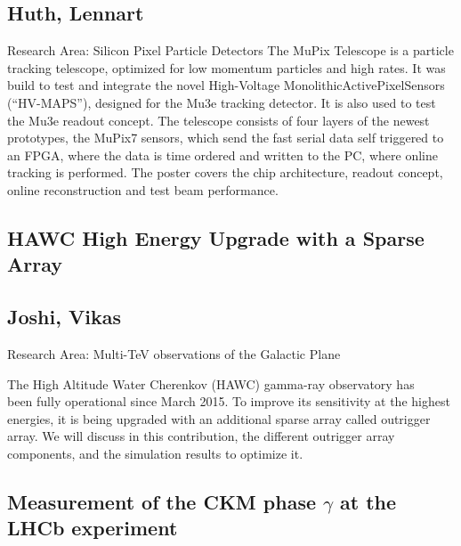 \subsection*{\centering \normalsize Huth, Lennart}
Research Area:  Silicon Pixel Particle Detectors
\newline
\noindent The MuPix Telescope is a particle tracking telescope, optimized for low momentum particles and high rates. It was build to test and integrate the novel High-Voltage MonolithicActivePixelSensors (“HV-MAPS”), designed for the Mu3e tracking detector. It is also used to test the Mu3e readout concept.
The telescope consists of four layers of the newest prototypes, the MuPix7 sensors, which send the fast serial data self triggered to an FPGA, where the data is time ordered and written to the PC, where online tracking is performed.
The poster covers the chip architecture, readout concept, online reconstruction and test beam performance.


\subsection*{\centering \large HAWC High Energy Upgrade with a Sparse Array}
\subsection*{\centering \normalsize Joshi, Vikas}
Research Area: Multi-TeV observations of the Galactic Plane\newline

\noindent The High Altitude Water Cherenkov (HAWC) gamma-ray observatory has\\been fully operational since March 2015. To improve its sensitivity at the highest energies, it is being upgraded with an additional sparse array called outrigger array. We will discuss in this contribution, the different outrigger array components, and the simulation results to optimize it.

\newpage

\subsection*{\centering \large Measurement of the CKM phase $\gamma$ at the LHCb experiment }

